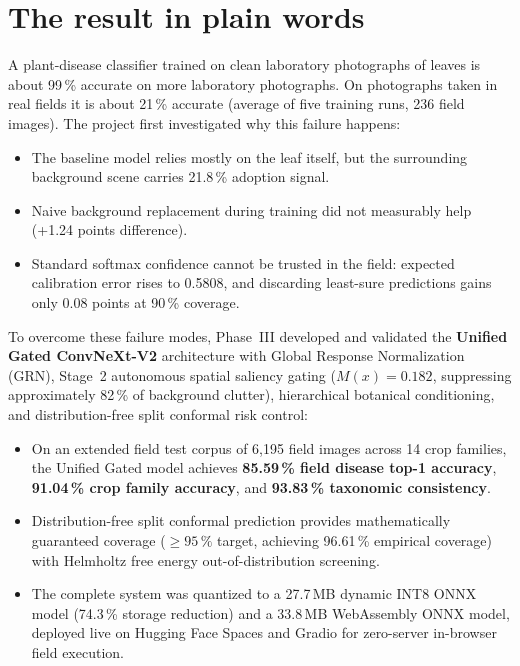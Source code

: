 \documentclass[12pt,a4paper]{report}
\begin{document}
\section*{The result in plain words}

A plant-disease classifier trained on clean laboratory photographs of leaves is about
99\,\% accurate on more laboratory photographs. On photographs taken in real fields it
is about 21\,\% accurate (average of five training runs, 236 field images). The
project first investigated why this failure happens:
\begin{itemize}[leftmargin=1.4em,itemsep=2pt]
\item The baseline model relies mostly on the leaf itself, but the surrounding background scene carries 21.8\,\% adoption signal.
\item Naive background replacement during training did not measurably help (+1.24 points difference).
\item Standard softmax confidence cannot be trusted in the field: expected calibration error rises to 0.5808, and discarding least-sure predictions gains only 0.08 points at 90\,\% coverage.
\end{itemize}

To overcome these failure modes, Phase~III developed and validated the \textbf{Unified Gated ConvNeXt-V2} architecture with Global Response Normalization (GRN), Stage~2 autonomous spatial saliency gating ($M(x) = 0.182$, suppressing approximately 82\,\% of background clutter), hierarchical botanical conditioning, and distribution-free split conformal risk control:
\begin{itemize}[leftmargin=1.4em,itemsep=2pt]
\item On an extended field test corpus of 6{,}195 field images across 14 crop families, the Unified Gated model achieves \textbf{85.59\,\% field disease top-1 accuracy}, \textbf{91.04\,\% crop family accuracy}, and \textbf{93.83\,\% taxonomic consistency}.
\item Distribution-free split conformal prediction provides mathematically guaranteed coverage ($\ge 95\,\%$ target, achieving 96.61\,\% empirical coverage) with Helmholtz free energy out-of-distribution screening.
\item The complete system was quantized to a 27.7\,MB dynamic INT8 ONNX model (74.3\,\% storage reduction) and a 33.8\,MB WebAssembly ONNX model, deployed live on Hugging Face Spaces and Gradio for zero-server in-browser field execution.
\end{itemize}
\end{document}

